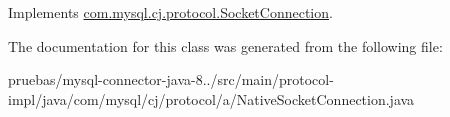 Implements \mbox{\hyperlink{interfacecom_1_1mysql_1_1cj_1_1protocol_1_1_socket_connection_ac20aea608e999684c82a0dbaaa5886c7}{com.\+mysql.\+cj.\+protocol.\+Socket\+Connection}}.



The documentation for this class was generated from the following file\+:\begin{DoxyCompactItemize}
\item 
pruebas/mysql-\/connector-\/java-\/8../src/main/protocol-\/impl/java/com/mysql/cj/protocol/a/Native\+Socket\+Connection.\+java\end{DoxyCompactItemize}
